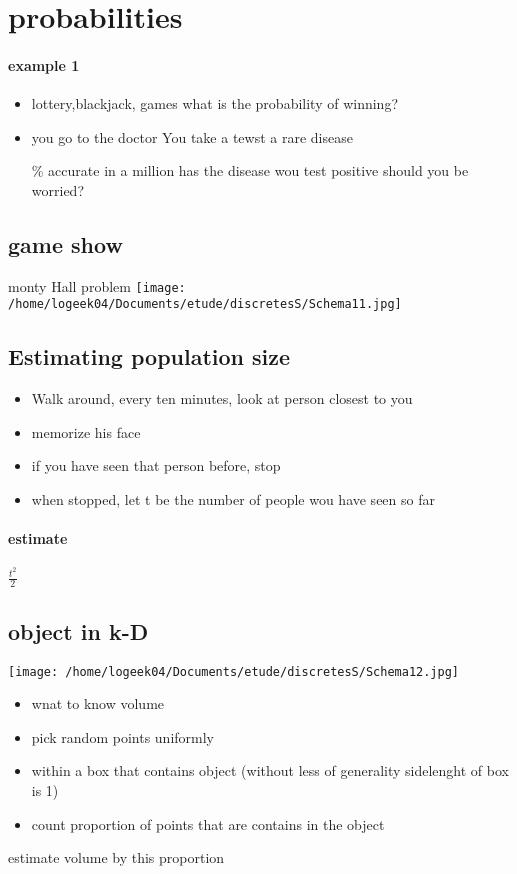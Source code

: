 \documentclass[a4paper,10pt]{article}
\begin{document}
\section{probabilities}
\paragraph{example 1}
\begin{itemize}
 \item lottery,blackjack, games
 \newline
what is the probability of winning?
\item you go to the doctor
\newline
You take a tewst a rare disease

\% accurate
 in a million has the disease
\subitem wou test positive
\subitem should you be worried?
\end{itemize}
\subsection{game show}
monty Hall problem
\texttt{[image: /home/logeek04/Documents/etude/discretesS/Schema11.jpg]}
\subsection{Estimating population size}
\begin{itemize}
 \item Walk around, every ten minutes, look at person closest to you
 \item memorize his face 
 \item if you have seen that person before, stop
 \item when stopped, let t be the number of people wou have seen so far 
\end{itemize}
\paragraph{estimate}
$\frac{t^2}{2}$
\subsection{object in k-D}
\texttt{[image: /home/logeek04/Documents/etude/discretesS/Schema12.jpg]}
\begin{itemize}
 \item wnat to know volume
 \item pick random points uniformly
 \item within a box that contains object (without less of generality sidelenght of box is 1)
 \item count proportion of points that are contains in the object 
\end{itemize}
estimate volume by this proportion
\end{document}
